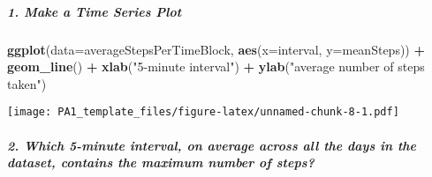 \documentclass[]{article}
\newenvironment{Shaded}{\begin{snugshade}}{\end{snugshade}}
\newcommand{\KeywordTok}[1]{\textcolor[rgb]{0.13,0.29,0.53}{\textbf{#1}}}
\newcommand{\DataTypeTok}[1]{\textcolor[rgb]{0.13,0.29,0.53}{#1}}
\newcommand{\CharTok}[1]{\textcolor[rgb]{0.31,0.60,0.02}{#1}}
\newcommand{\StringTok}[1]{\textcolor[rgb]{0.31,0.60,0.02}{#1}}
\newcommand{\OtherTok}[1]{\textcolor[rgb]{0.56,0.35,0.01}{#1}}
\newcommand{\OperatorTok}[1]{\textcolor[rgb]{0.81,0.36,0.00}{\textbf{#1}}}
\newcommand{\NormalTok}[1]{#1}
\let\oldsubparagraph\subparagraph
\renewcommand{\subparagraph}[1]{\oldsubparagraph{#1}\mbox{}}
\begin{document}
\begin{Shaded}
\end{Shaded}

\subparagraph{1. Make a Time Series Plot}\label{make-a-time-series-plot}

\begin{Shaded}
\begin{Highlighting}[]
\KeywordTok{ggplot}\NormalTok{(}\DataTypeTok{data=}\NormalTok{averageStepsPerTimeBlock, }\KeywordTok{aes}\NormalTok{(}\DataTypeTok{x=}\NormalTok{interval, }\DataTypeTok{y=}\NormalTok{meanSteps)) }\OperatorTok{+}
\StringTok{    }\KeywordTok{geom_line}\NormalTok{() }\OperatorTok{+}
\StringTok{    }\KeywordTok{xlab}\NormalTok{(}\StringTok{"5-minute interval"}\NormalTok{) }\OperatorTok{+}
\StringTok{    }\KeywordTok{ylab}\NormalTok{(}\StringTok{"average number of steps taken"}\NormalTok{) }
\end{Highlighting}
\end{Shaded}

\texttt{[image: PA1\_template\_files/figure-latex/unnamed-chunk-8-1.pdf]}

\subparagraph{2. Which 5-minute interval, on average across all the days
in the dataset, contains the maximum number of
steps?}\label{which-5-minute-interval-on-average-across-all-the-days-in-the-dataset-contains-the-maximum-number-of-steps}

\begin{Shaded}
\end{Shaded}
\end{document}
